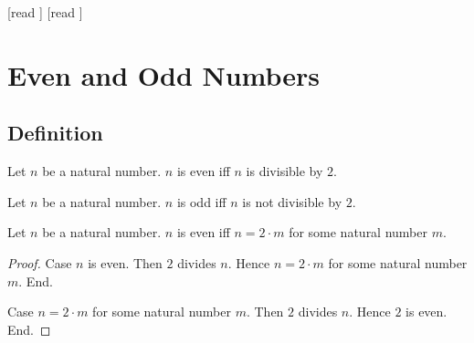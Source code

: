 \documentclass[10pt]{article}
\begin{document}
  \begin{imports}
    \begin{forthel}
      [read ]
      [read ]
    \end{forthel}
  \end{imports}


  \section*{Even and Odd Numbers}

  \subsection*{Definition}

  \begin{forthel}
    \begin{definition}[id=ARITHMETIC_15_4521358965847512,printid]
      Let $n$ be a natural number.
      $n$ is even iff $n$ is divisible by $2$.
    \end{definition}
  \end{forthel}

  \begin{forthel}
    \begin{definition}[id=ARITHMETIC_15_1023652125874596,printid]
      Let $n$ be a natural number.
      $n$ is odd iff $n$ is not divisible by $2$.
    \end{definition}
  \end{forthel}

  \begin{forthel}
    \begin{proposition}[id=ARITHMETIC_15_0236985458752156,printid]
      Let $n$ be a natural number.
      $n$ is even iff $n = 2 \cdot m$ for some natural number $m$.
    \end{proposition}
    \begin{proof}
      Case $n$ is even.
        Then $2$ divides $n$.
        Hence $n = 2 \cdot m$ for some natural number $m$.
      End.

      Case $n = 2 \cdot m$ for some natural number $m$.
        Then $2$ divides $n$.
        Hence $2$ is even.
      End.
    \end{proof}
  \end{forthel}
\end{document}
